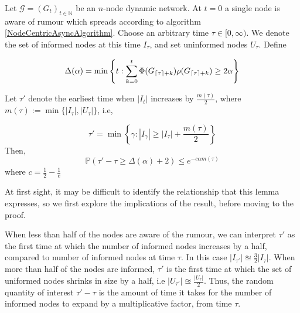 \begin{lemma} \label{AsyncIncreaseLemma}
	Let $\mathcal{G}=(G_t)_{t \in \mathbb{N}}$ be an $n$-node dynamic network. At $t=0$ a single node is aware of rumour which spreads according to algorithm \ref{NodeCentricAsyncAlgorithm}. Choose an arbitrary time $\tau \in [0, \infty)$. We denote the set of informed nodes at this time $I_\tau$, and set uninformed nodes $U_\tau$.
	\noindent
	Define 
	
	$$
	\Delta(\alpha) = \min \left\{t: \sum_{k=0}^t \Phi(G_{\lceil\tau\rceil+k})\rho(G_{\lceil\tau\rceil+k}) \geq 2 \alpha \right\}
	$$

	\noindent
	Let $\tau'$ denote the earliest time when $|I_t|$ increases by $\frac{m(\tau)}{2}$, where $m(\tau) := \min\{|I_\tau|, |U_\tau|\}$, i.e,

	$$
		\tau' = \min\left\{\gamma : |I_{\gamma}| \geq |I_\tau| + \frac{m(\tau)}{2}\right\}
	$$
	\noindent
	Then, 
	$$
		\mathbb{P}(\tau' - \tau \geq \Delta(\alpha) + 2) \leq e^{-c\alpha m(\tau)}
	$$
	\noindent
	where $c = \frac{1}{2} - \frac{1}{e}$
\end{lemma}


At first sight, it may be difficult to identify the relationship that this lemma expresses, so we first explore the implications of the result, before moving to the proof.

When less than half of the nodes are aware of the rumour, we can interpret $\tau'$ as the first time at which the number of informed nodes increases by a half, compared to number of informed nodes at time $\tau$. In this case $|I_{\tau'}| \approxeq \frac{3}{2} |I_\tau|$. When more than half of the nodes are informed, $\tau'$ is the first time at which the set of uniformed nodes shrinks in size by a half, i.e $|U_{\tau'}| \approxeq \frac{|U_\tau|}{2}$. Thus, the random quantity of interest $\tau'-\tau$ is the amount of time it takes for the number of informed nodes to expand by a multiplicative factor, from time $\tau$. 

